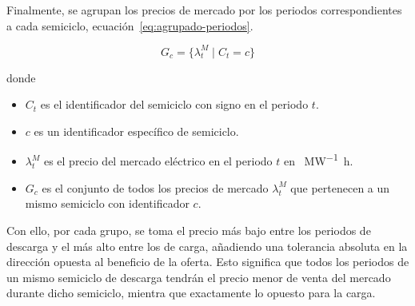   Finalmente, se agrupan los precios de mercado por los periodos correspondientes a cada semiciclo, ecuación~\ref{eq:agrupado-periodos}.

  \begin{samepage}

    \begin{equation}
      \label{eq:agrupado-periodos}
      G_{c} = \{ \lambda^{M}_{t} \mid C_{t} = c \}
    \end{equation}

    donde

    \begin{itemize}

      \item \( C_{t} \) es el identificador del semiciclo con signo en el periodo \( t \).

      \item \( c \) es un identificador específico de semiciclo.

      \item \( \lambda^{M}_{t} \) es el precio del mercado eléctrico en el periodo \( t \) en \si{\text{\euro}\per\mega\watt\hour}.

      \item \( G_{c} \) es el conjunto de todos los precios de mercado \( \lambda^{M}_{t} \) que pertenecen a un mismo semiciclo con identificador \( c \).

    \end{itemize}

  \end{samepage}

  Con ello, por cada grupo, se toma el precio más bajo entre los periodos de descarga y el más alto entre los de carga, añadiendo una tolerancia absoluta en la dirección opuesta al beneficio de la oferta. Esto significa que todos los periodos de un mismo semiciclo de descarga tendrán el precio menor de venta del mercado durante dicho semiciclo, mientra que exactamente lo opuesto para la carga.

